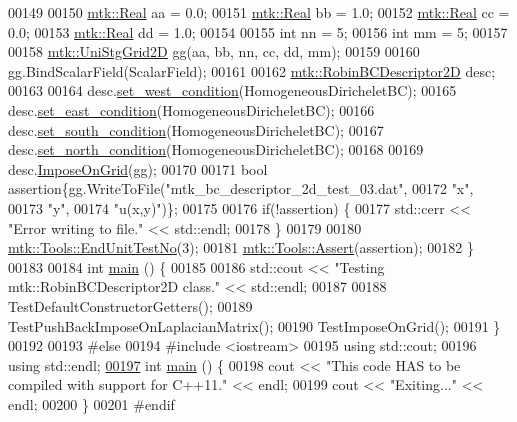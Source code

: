 \begin{DoxyCode}
00149 
00150   \hyperlink{group__c01-roots_gac080bbbf5cbb5502c9f00405f894857d}{mtk::Real} aa = 0.0;
00151   \hyperlink{group__c01-roots_gac080bbbf5cbb5502c9f00405f894857d}{mtk::Real} bb = 1.0;
00152   \hyperlink{group__c01-roots_gac080bbbf5cbb5502c9f00405f894857d}{mtk::Real} cc = 0.0;
00153   \hyperlink{group__c01-roots_gac080bbbf5cbb5502c9f00405f894857d}{mtk::Real} dd = 1.0;
00154 
00155   \textcolor{keywordtype}{int} nn = 5;
00156   \textcolor{keywordtype}{int} mm = 5;
00157 
00158   \hyperlink{classmtk_1_1UniStgGrid2D}{mtk::UniStgGrid2D} gg(aa, bb, nn, cc, dd, mm);
00159 
00160   gg.BindScalarField(ScalarField);
00161 
00162   \hyperlink{classmtk_1_1RobinBCDescriptor2D}{mtk::RobinBCDescriptor2D} desc;
00163 
00164   desc.\hyperlink{classmtk_1_1RobinBCDescriptor2D_aeaff87510dc1773effc0b5429579de23}{set\_west\_condition}(HomogeneousDiricheletBC);
00165   desc.\hyperlink{classmtk_1_1RobinBCDescriptor2D_a94570f6e741bb00038c4bf81842d226c}{set\_east\_condition}(HomogeneousDiricheletBC);
00166   desc.\hyperlink{classmtk_1_1RobinBCDescriptor2D_a3fbdf58ba24861011fd852f0c642a4c8}{set\_south\_condition}(HomogeneousDiricheletBC);
00167   desc.\hyperlink{classmtk_1_1RobinBCDescriptor2D_ade17884e6a2636a7c6f989602a0052e0}{set\_north\_condition}(HomogeneousDiricheletBC);
00168 
00169   desc.\hyperlink{classmtk_1_1RobinBCDescriptor2D_ac9564bc46c196cbf4720a0e4b93da8b0}{ImposeOnGrid}(gg);
00170 
00171   \textcolor{keywordtype}{bool} assertion\{gg.WriteToFile(\textcolor{stringliteral}{"mtk\_bc\_descriptor\_2d\_test\_03.dat"},
00172                                 \textcolor{stringliteral}{"x"},
00173                                 \textcolor{stringliteral}{"y"},
00174                                 \textcolor{stringliteral}{"u(x,y)"})\};
00175 
00176   \textcolor{keywordflow}{if}(!assertion) \{
00177     std::cerr << \textcolor{stringliteral}{"Error writing to file."} << std::endl;
00178   \}
00179 
00180   \hyperlink{classmtk_1_1Tools_aba67d9dc35c9c1c49430fcc9ea035e03}{mtk::Tools::EndUnitTestNo}(3);
00181   \hyperlink{classmtk_1_1Tools_ac6804df469c94ab6a796fb64f1e44a89}{mtk::Tools::Assert}(assertion);
00182 \}
00183 
00184 \textcolor{keywordtype}{int} \hyperlink{mtk__robin__bc__descriptor__2d__test_8cc_ae66f6b31b5ad750f1fe042a706a4e3d4}{main} () \{
00185 
00186   std::cout << \textcolor{stringliteral}{"Testing mtk::RobinBCDescriptor2D class."} << std::endl;
00187 
00188   TestDefaultConstructorGetters();
00189   TestPushBackImposeOnLaplacianMatrix();
00190   TestImposeOnGrid();
00191 \}
00192 
00193 \textcolor{preprocessor}{#else}
00194 \textcolor{preprocessor}{#include <iostream>}
00195 \textcolor{keyword}{using} std::cout;
00196 \textcolor{keyword}{using} std::endl;
\hypertarget{mtk__robin__bc__descriptor__2d__test_8cc_source_l00197}{}\hyperlink{mtk__robin__bc__descriptor__2d__test_8cc_ae66f6b31b5ad750f1fe042a706a4e3d4}{00197} \textcolor{keywordtype}{int} \hyperlink{mtk__robin__bc__descriptor__2d__test_8cc_ae66f6b31b5ad750f1fe042a706a4e3d4}{main} () \{
00198   cout << \textcolor{stringliteral}{"This code HAS to be compiled with support for C++11."} << endl;
00199   cout << \textcolor{stringliteral}{"Exiting..."} << endl;
00200 \}
00201 \textcolor{preprocessor}{#endif}
\end{DoxyCode}
